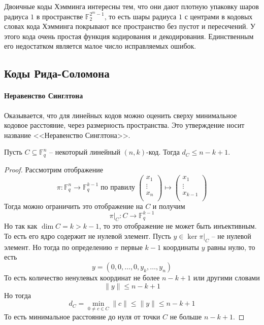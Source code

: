 Двоичные коды Хэмминга интересны тем, что они дают плотную упаковку шаров радиуса $1$ в пространстве $\mathbb F_2^{2^m - 1}$, то есть шары радиуса $1$ с центрами в кодовых словах кода Хэмминга покрывают все пространство без пустот и пересечений.
У этого кода очень простая функция кодирования и декодирования.
Единственным его недостатком является малое число исправляемых ошибок.

\subsection{Коды Рида-Соломона}
\label{section::ReedSolomonCodes}

\paragraph{Неравенство Синглтона}

Оказывается, что для линейных кодов можно оценить сверху минимальное кодовое расстояние, через размерность пространства.
Это утверждение носит название <<Неравенство Синглтона>>.

\begin{claim}
\label{claim::SingletonIneq}
Пусть $C\subseteq \mathbb F_q^n$ -- некоторый линейный $(n,k)$-код.
Тогда $d_C \leqslant n - k + 1$.
\end{claim}
\begin{proof}
Рассмотрим отображение
\[
\pi\colon \mathbb F_q^n \to \mathbb F_q^{k-1}\;\text{по правилу}\;
\begin{pmatrix}
{x_1}\\{\vdots}\\{x_n}\\
\end{pmatrix}
\mapsto
\begin{pmatrix}
{x_1}\\{\vdots}\\{x_{k-1}}\\
\end{pmatrix}
\]
Тогда можно ограничить это отображение на $C$ и получим
\[
\pi|_C \colon C\to \mathbb F_q^{k-1}
\]
Но так как $\dim C = k > k-1$, то это отображение не может быть инъективным.
То есть его ядро содержит не нулевой элемент.
Пусть $y\in \ker \pi|_C$ -- не нулевой элемент.
Но тогда по определению $\pi$ первые $k-1$ координаты $y$ равны нулю, то есть
\[
y = (0, 0, \ldots, 0, y_{k},\ldots, y_n)
\]
То есть количество ненулевых координат не более $n - k + 1$ или другими словами
\[
\|y\| \leqslant n - k + 1
\]
Но тогда
\[
d_C = \min_{0\neq c \in C}\|c\| \leqslant \|y\| \leqslant n - k + 1
\]
То есть минимальное расстояние до нуля от точки $C$ не больше $n - k + 1$.
\end{proof}

